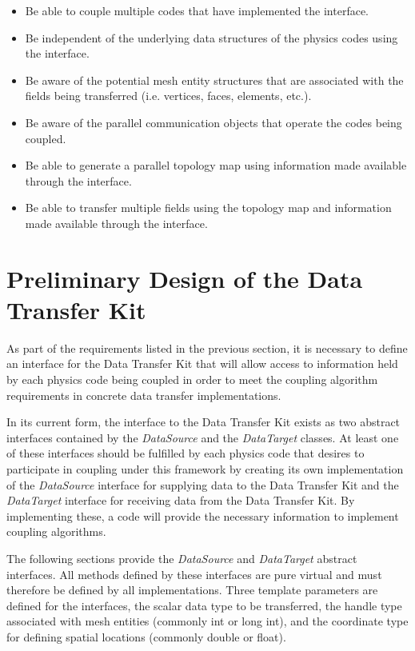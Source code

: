 \documentclass[letterpaper]{article}
\begin{document}
\begin{itemize}
\item Be able to couple multiple codes that have implemented the
  interface.
\item Be independent of the underlying data structures of the physics
  codes using the interface.
\item Be aware of the potential mesh entity structures that are
  associated with the fields being transferred (i.e. vertices, faces,
  elements, etc.).
\item Be aware of the parallel communication objects that operate the
  codes being coupled.
\item Be able to generate a parallel topology map using information
  made available through the interface.
\item Be able to transfer multiple fields using the topology map and
  information made available through the interface.
\end{itemize}

\section{Preliminary Design of the Data Transfer Kit}
As part of the requirements listed in the previous section, it is
necessary to define an interface for the Data Transfer Kit that will
allow access to information held by each physics code being coupled in
order to meet the coupling algorithm requirements in concrete data
transfer implementations.

In its current form, the interface to the Data Transfer Kit exists as
two abstract interfaces contained by the {\sl DataSource} and the
{\sl DataTarget} classes. At least one of these interfaces should be
fulfilled by each physics code that desires to participate in coupling
under this framework by creating its own implementation of the {\sl
  DataSource} interface for supplying data to the Data Transfer Kit
and the {\sl DataTarget} interface for receiving data from the
Data Transfer Kit. By implementing these, a code will provide the
necessary information to implement coupling algorithms. 

The following sections provide the {\sl DataSource} and {\sl
  DataTarget} abstract interfaces. All methods defined by these
interfaces are pure virtual and must therefore be defined by all
implementations. Three template parameters are defined for the
interfaces, the scalar data type to be transferred, the handle type
associated with mesh entities (commonly int or long int), and the
coordinate type for defining spatial locations (commonly double or float).
\end{document}
